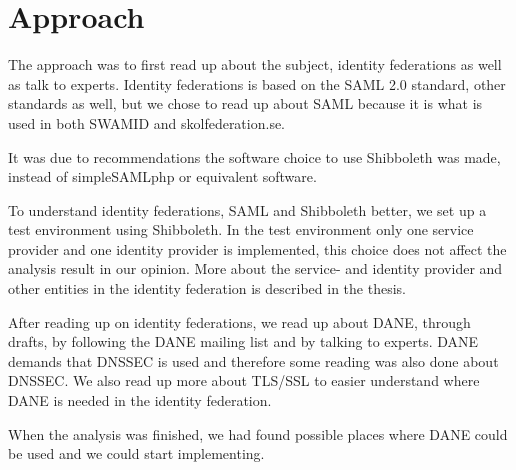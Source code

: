 \section{Approach}

The approach was to first read up about the subject, identity federations as well as talk to experts. 
Identity federations is based on the SAML 2.0 standard, other standards as well,
but we chose to read up about SAML because it is what is used in both SWAMID and skolfederation.se. 

It was due to recommendations the software choice to use Shibboleth was made, 
instead of simpleSAMLphp or equivalent software.
 
To understand identity federations, SAML and Shibboleth better, we set up a test environment using Shibboleth. 
In the test environment only one service provider and one identity provider is implemented, 
this choice does not affect the analysis result in our opinion. 
More about the service- and identity provider and other entities in the identity federation is described in the thesis. 

After reading up on identity federations, we read up about DANE, through drafts, by following the DANE mailing list and by talking to experts. DANE demands that DNSSEC is used and therefore some reading was also done about DNSSEC. We also read up more about TLS/SSL to easier understand where DANE is needed in the identity federation.

When the analysis was finished, we had found possible places where DANE could be used and we could start implementing.









